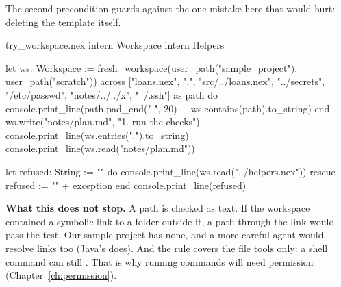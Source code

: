 The second precondition guards against the one mistake here that would
hurt: deleting the template itself.

\begin{tryit}{try_workspace.nex}
intern Workspace
intern Helpers

let ws: Workspace := fresh_workspace(user_path("sample_project"), user_path("scratch"))
across ["loans.nex", ".", "src/../loans.nex", "../secrets", "/etc/passwd",
    "notes/../../x", "~/.ssh"] as path do
  console.print_line(path.pad_end(" ", 20) + ws.contains(path).to_string)
end
ws.write("notes/plan.md", "1. run the checks\n")
console.print_line(ws.entries(".").to_string)
console.print_line(ws.read("notes/plan.md"))

let refused: String := ""
do
  console.print_line(ws.read("../helpers.nex"))
rescue
  refused := "" + exception
end
console.print_line(refused)
\end{tryit}

\begin{aside}
\textbf{What this does not stop.} A path is checked as text. If the
workspace contained a symbolic link to a folder outside it, a path through
the link would pass the test. Our sample project has none, and a more
careful agent would resolve links too (Java's  does). And
the rule covers the file tools only: a shell command can still
. That is why running commands will need permission
(Chapter~\ref{ch:permission}).
\end{aside}
